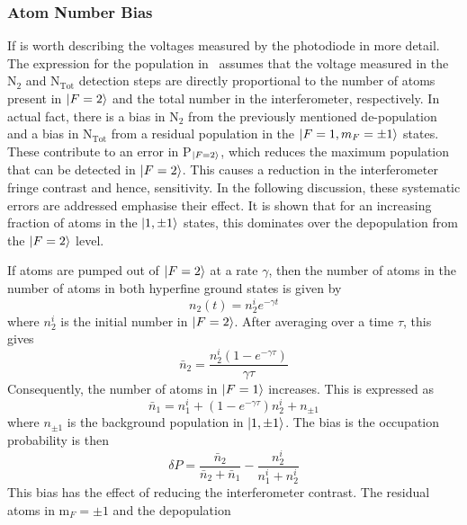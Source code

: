\subsubsection{Atom Number Bias}\label{subsec:atom_number_bias}
If is worth describing the voltages measured by the photodiode in more
detail.
The expression for the population in~ assumes that the voltage measured in
the N\(_2\) and N\(_\text{Tot}\) detection steps are directly
proportional to the number of atoms present in \(\ket{F=2}\) and the
total number in the interferometer, respectively. In actual fact,
there is a bias in N\(_2\) from the previously mentioned de-population
and a bias in N\(_\text{Tot}\) from a residual population in the
\(\ket{F=1,m_F=\pm 1}\) states. These contribute to an error in
P\(_{\ket{F=2}}\), which reduces the maximum population that can be
detected in \(\ket{F=2}\). This causes a reduction in the
interferometer fringe contrast and hence, sensitivity. In the
following discussion, these systematic errors are addressed emphasise
their effect. It is shown that for an increasing fraction of
atoms in the $\ket{1,\pm 1}$ states, this dominates over the
depopulation from the $\ket{F=2}$ level.
\par\noindent
If atoms are pumped out of
\(\ket{F=2}\) at a rate \(\gamma\), then the number of atoms in the
number of atoms in both hyperfine ground states is given by
\begin{equation}
  n_2(t) = n^i_2e^{-\gamma t}
  \label{eq:n2_time}
\end{equation}
where \(n^i_2\) is the initial number in \(\ket{F=2}\). After
averaging over a time \(\tau\), this gives
\begin{equation}
  \bar{n}_2 = \frac{n^i_2 (1-e^{-\gamma \tau})}{\gamma \tau}
  \label{eq:n2_avg}
\end{equation}
Consequently, the number of atoms in \(\ket{F=1}\) increases. This is
expressed as
\begin{equation}
\bar{n}_1 = n_1^i + (1-e^{-\gamma \tau})n_2^i + n_{\pm 1}
  \label{eq:n1_avg}
\end{equation}
where \(n_{\pm 1}\) is the background population in \(\ket{1,\pm{1}}\). The bias
is the occupation probability is then
\begin{equation}
\delta P =  \frac{\bar{n}_2}{\bar{n}_2 + \bar{n}_1} - \frac{n^i_2}{n_1^i + n_2^i}
  \label{eq:prob_bias}
\end{equation}
This bias has the effect of reducing the interferometer contrast.
The residual atoms in m\(_F = \pm 1\) and the depopulation

